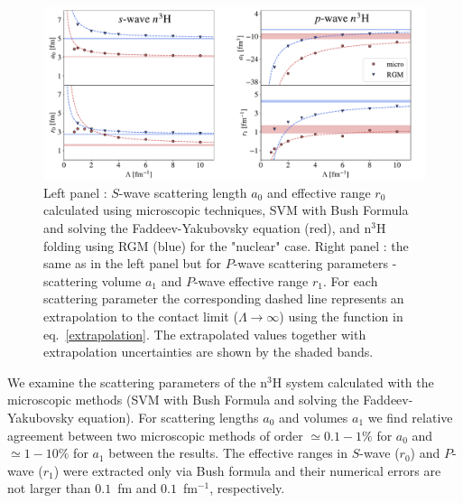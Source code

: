 \documentclass[5p,times]{elsarticle}
\begin{document}
\begin{figure}
\centering
  \centering
  \includegraphics[width=\linewidth]{Graphs/ere.pdf}
  \caption{Left panel : $S$-wave scattering length $a_0$ and effective range $r_0$ calculated using microscopic techniques, SVM with Bush Formula and solving the Faddeev-Yakubovsky equation (red), and n$^3$H folding using RGM (blue) for the "nuclear" case. Right panel : the same as in the left panel but for $P$-wave scattering parameters - scattering volume $a_1$ and $P$-wave effective range $r_1$. For each scattering parameter the corresponding dashed line represents an extrapolation to the contact limit ($\Lambda \rightarrow \infty$) using the function in eq.~\ref{extrapolation}. The extrapolated values together with extrapolation uncertainties are shown by the shaded bands.}
  \label{fig:ERE_Parameters}
\end{figure}


We examine the scattering parameters of the n$^3$H system calculated with the microscopic methods (SVM with Bush Formula and solving the Faddeev-Yakubovsky equation). 
For scattering lengths $a_0$ and volumes $a_1$ we find relative agreement between two microscopic methods of order $\simeq 0.1-1 \%$ for $a_0$ and $\simeq 1-10\%$ for $a_1$ between the results. 
The effective ranges in $S$-wave ($r_0$) and $P$-wave ($r_1$) were extracted only via Bush formula and their numerical errors are not larger than $0.1$~fm and $0.1$~fm$^{-1}$, respectively.
\end{document}
